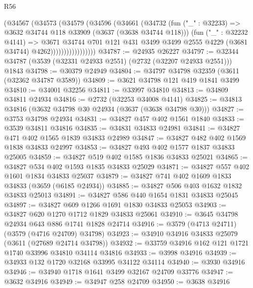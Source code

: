 \begin{lexlean}{R56}
\begin{coremodule}
                        (@34567
                          (@34573
                            (@34579
                              (@34596
                                (@34661
                                  (@34732
                                    (fun ("_" : @32233) =>
                                    @3632 @34744 @118 @33909 (@3637 (@3638 @34744 @118)))
                                    (fun ("_" : @32232 @4141) =>
                                    @3671
                                      @34744
                                      @701
                                      @121
                                      @431
                                      @3499
                                      @3499
                                      @2555
                                      @4229
                                      (@3681 @34744)
                                      @4262)))))))))))))))))
@34787 := @24935 @26227
@34797 := @32344 @34787 (@3539 (@32331 @24933 @2551) (@2732 (@32207 @24933 @2551))) @1843
@34798 := @30379 @24949
@34804 := @34797 @34798 @32359 (@3611 (@32362 @34787 @3589))
@34809 := @3621 @34798 @121 @419 @1841 @3499
@34810 := @34001 @32256
@34811 := @33997 @34810
@34813 := @34809 @34811 @24934
@34816 := @2732 (@32253 @34008 @4141)
@34825 := @34813 @34816 (@3632 @34798 @30 @24934 (@3637 (@3638 @34798 @30)))
@34827 := @3753 @34798 @24934
@34831 := @34827 @457 @402 @1561 @1840
@34833 := @3539 @34811 @34816
@34835 := @34831 @34833 @24981
@34841 := @34827 @471 @402 @1565 @1839 @34833 @24989
@34847 := @34827 @482 @402 @1569 @1838 @34833 @24997
@34853 := @34827 @493 @402 @1577 @1837 @34833 @25005
@34859 := @34827 @519 @402 @1585 @1836 @34833 @25021
@34865 := @34827 @534 @402 @1593 @1835 @34833 @25029
@34871 := @34827 @557 @402 @1601 @1834 @34833 @25037
@34879 := @34827 @741 @402 @1609 @1833 @34833 (@3659 (@6185 @24934))
@34885 := @34827 @506 @403 @1632 @1832 @34833 @25013
@34891 := @34827 @586 @440 @1654 @1831 @34833 @25045
@34897 := @34827 @609 @1266 @1691 @1830 @34833 @25053
@34903 := @34827 @620 @1270 @1712 @1829 @34833 @25061
@34910 := @3645 @34798 @24934 @643 @886 @1741 @1828 @24714
@34916 := @3579 (@4713 @24711) (@3579 (@4716 @24709) @34798)
@34923 := @34910 @34916 @34833 @25079 (@3611 (@27689 @24714 @34798))
@34932 := @33759 @34916 @162 @121 @1721 @1740 @33996 @34810 @34114 @34816
@34933 := @3998 @34916
@34939 := @34933 @132 @1720 @32168 @33995 @34122 @34114
@34940 := @3930 @34916
@34946 := @34940 @1718 @1641 @3499 @32167 @24709 @33776
@34947 := @3632 @34916
@34949 := @34947 @258 @24709
@34950 := @3638 @34916

\end{coremodule}
\end{lexlean}

